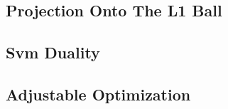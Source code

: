\subsection{Projection Onto The L1 Ball}
\subsection{Svm Duality}
\subsection{Adjustable Optimization}
